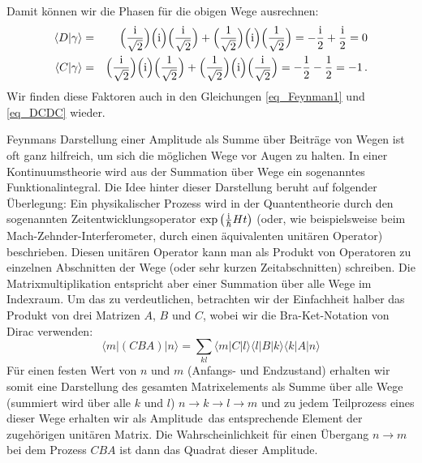 Damit k\"onnen wir die Phasen f\"ur die obigen Wege ausrechnen:
\begin{eqnarray}
     \langle D | \gamma \rangle &=&  \Big( \frac{\rm i}{\sqrt{2}}\Big) \Big( {\rm i} \Big) \Big( \frac{\rm i}{\sqrt{2}}\Big) 
       +  \Big( \frac{1}{\sqrt{2}}\Big) \Big( {\rm i} \Big) \Big( \frac{1}{\sqrt{2}}\Big) 
          = - \frac{\rm i}{2} + \frac{\rm i}{2} = 0     \\
     \langle C | \gamma \rangle &=&  \Big( \frac{\rm i}{\sqrt{2}}\Big)\Big( {\rm i}\Big)\Big( \frac{1}{\sqrt{2}} \Big)
     + \Big( \frac{1}{\sqrt{2}}\Big)\Big( {\rm i} \Big)\Big(\frac{\rm i}{\sqrt{2}} \Big)
     = - \frac{1}{2} - \frac{1}{2} = -1  \, .  
\end{eqnarray}
Wir finden diese Faktoren auch in den Gleichungen \ref{eq_Feynman1} und \ref{eq_DCDC} wieder.

Feynmans Darstellung einer Amplitude als Summe \"uber Beitr\"age von Wegen ist oft
ganz hilfreich, um sich die m\"oglichen Wege vor Augen zu halten. In einer Kontinuumstheorie wird
aus der Summation \"uber Wege ein sogenanntes Funktionalintegral. Die Idee hinter dieser
Darstellung beruht auf folgender \"Uberlegung: Ein physikalischer Prozess wird in der Quantentheorie
durch den sogenannten Zeitentwicklungsoperator $\exp \big( \frac{\rm i}{\hbar} H t\big) $ (oder, wie
beispielsweise beim Mach-Zehnder-Interferometer, durch einen \"aquivalenten unit\"aren Operator)
beschrieben. 
Diesen unit\"aren Operator kann man als Produkt von Operatoren zu einzelnen
Abschnitten der Wege (oder sehr kurzen Zeitabschnitten) schreiben. Die Matrixmultiplikation entspricht
aber einer \glqq Summation \"uber alle Wege im Indexraum\grqq. Um das zu verdeutlichen, betrachten
wir der Einfachheit halber das Produkt von drei Matrizen $A$, $B$ und $C$, wobei wir die Bra-Ket-Notation
von Dirac verwenden:
\begin{equation}
     \langle m | (CBA)| n \rangle 
            = \sum_{kl}  \langle m | C | l \rangle \langle l |B | k \rangle \langle  k| A| n \rangle  
\end{equation} 
F\"ur einen festen Wert von $n$ und $m$ (Anfangs- und Endzustand) erhalten wir somit
eine Darstellung des gesamten Matrixelements als Summe \"uber alle Wege 
(summiert wird \"uber alle $k$ und $l$) 
$ n \rightarrow k \rightarrow l \rightarrow m$ und zu jedem Teilprozess eines dieser Wege erhalten
wir als \glqq Amplitude\grqq\ das entsprechende Element der zugeh\"origen unit\"aren Matrix.
Die Wahrscheinlichkeit f\"ur einen \"Ubergang $n\rightarrow m$ bei dem Prozess $CBA$ 
ist dann das Quadrat dieser Amplitude. 
 
